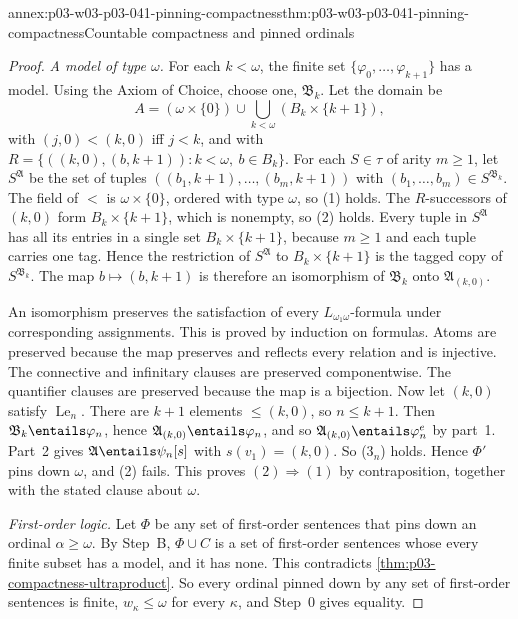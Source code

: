 \begin{annexitem}{annex:p03-w03-p03-041-pinning-compactness}{thm:p03-w03-p03-041-pinning-compactness}{Countable compactness and pinned ordinals}
\begin{proof}
\emph{A model of type \(\omega\).} For each \(k<\omega\), the finite set
\(\{\varphi_0,\ldots,\varphi_{k+1}\}\) has a model. Using the Axiom of
Choice, choose one, \(\mathfrak B_k\). Let the domain be
\[
 A=(\omega\times\{0\})\cup\bigcup_{k<\omega}(B_k\times\{k+1\}),
\]
with \((j,0)<(k,0)\) iff \(j<k\), and with
\(R=\{((k,0),(b,k+1)):k<\omega,\ b\in B_k\}\). For each \(S\in\tau\) of
arity \(m\geq1\), let \(S^{\mathfrak A}\) be the set of tuples
\(((b_1,k+1),\ldots,(b_m,k+1))\) with
\((b_1,\ldots,b_m)\in S^{\mathfrak B_k}\). The field of \(<\) is
\(\omega\times\{0\}\), ordered with type \(\omega\), so (1) holds. The
\(R\)-successors of \((k,0)\) form \(B_k\times\{k+1\}\), which is nonempty,
so (2) holds. Every tuple in \(S^{\mathfrak A}\) has all its entries in a
single set \(B_k\times\{k+1\}\), because \(m\geq1\) and each tuple carries
one tag. Hence the restriction of \(S^{\mathfrak A}\) to
\(B_k\times\{k+1\}\) is the tagged copy of \(S^{\mathfrak B_k}\). The map
\(b\mapsto(b,k+1)\) is therefore an isomorphism of \(\mathfrak B_k\) onto
\(\mathfrak A_{(k,0)}\).

An isomorphism preserves the satisfaction of every
\(L_{\omega_1\omega}\)-formula under corresponding assignments. This is
proved by induction on formulas. Atoms are preserved because the map
preserves and reflects every relation and is injective. The connective
and infinitary clauses are preserved componentwise. The quantifier clauses
are preserved because the map is a bijection. Now let \((k,0)\) satisfy
\(\operatorname{Le}_n\). There are \(k+1\) elements \(\leq(k,0)\), so
\(n\leq k+1\). Then \(\mathfrak B_k\entails\varphi_n\), hence
\(\mathfrak A_{(k,0)}\entails\varphi_n\), and so
\(\mathfrak A_{(k,0)}\entails\varphi_n^{e}\) by part~1. Part~2 gives
\(\mathfrak A\entails\psi_n[s]\) with \(s(v_1)=(k,0)\). So (3\(_n\))
holds. Hence \(\Phi'\) pins down \(\omega\), and (2) fails. This proves
\((2)\Rightarrow(1)\) by contraposition, together with the stated clause
about \(\omega\).

\emph{First-order logic.} Let \(\Phi\) be any set of first-order sentences
that pins down an ordinal \(\alpha\geq\omega\). By Step~B,
\(\Phi\cup C\) is a set of first-order sentences whose every finite subset
has a model, and it has none. This contradicts
\cref{thm:p03-compactness-ultraproduct}. So every ordinal pinned down by any set of
first-order sentences is finite, \(w_\kappa\leq\omega\) for every
\(\kappa\), and Step~0 gives equality.
\end{proof}
\end{annexitem}

